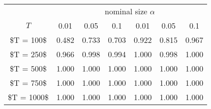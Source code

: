 % 
\begin{tabular}{ccccccc}
  \hline
  & \multicolumn{6}{c}{nominal size $\alpha$} \\
 $T$ & 0.01 & 0.05 & 0.1 & 0.01 & 0.05 & 0.1 \\
 \hline
\$T = 100\$ & 0.482 & 0.733 & 0.703 & 0.922 & 0.815 & 0.967 \\ 
  \$T = 250\$ & 0.966 & 0.998 & 0.994 & 1.000 & 0.998 & 1.000 \\ 
  \$T = 500\$ & 1.000 & 1.000 & 1.000 & 1.000 & 1.000 & 1.000 \\ 
  \$T = 750\$ & 1.000 & 1.000 & 1.000 & 1.000 & 1.000 & 1.000 \\ 
  \$T = 1000\$ & 1.000 & 1.000 & 1.000 & 1.000 & 1.000 & 1.000 \\ 
   \hline
\end{tabular}
